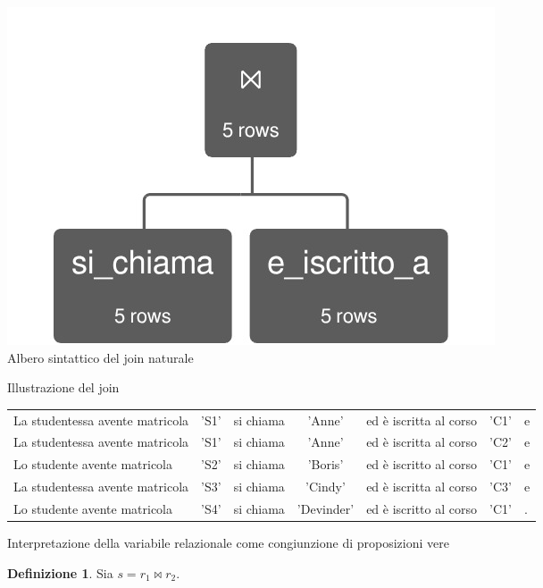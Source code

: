 \documentclass[withtimes]{easychair}
\theoremstyle{definition}
\newtheorem{definition}{Definizione}
\begin{document}
\begin{figure}[htp]
	\centering	
	\begin{subfigure}[t]{.75\textwidth}
		\centering
		\includegraphics[width=.4\textwidth]{img/inner_join}
		\caption{Albero sintattico del join naturale}\label{fig:inner-join-syn-tree}
	\end{subfigure}

	\vspace{1cm}	
		
	\begin{subfigure}[t]{\textwidth}
		\centering
		
      \caption{Illustrazione del join\label{fig:table-join}}
	\end{subfigure}

	\vspace{1cm}	
	
	\begin{subfigure}[t]{\textwidth}
		\centering
\begin{tabular}{lclclcl}
La studentessa avente matricola & 'S1' & si chiama & 'Anne' & ed è iscritta al corso & 'C1' & e \\
La studentessa avente matricola & 'S1' & si chiama & 'Anne' & ed è iscritta al corso & 'C2' & e \\
Lo studente avente matricola & 'S2' & si chiama & 	'Boris'& ed è iscritto al corso & 'C1' & e \\
La studentessa avente matricola & 'S3' & si chiama & 'Cindy'& ed è iscritta al corso & 'C3' &  e \\
Lo studente avente matricola & 'S4' & si chiama & 'Devinder'& ed è iscritto al corso & 'C1' & . \\
\end{tabular}
\caption{Interpretazione della variabile relazionale come congiunzione di proposizioni vere}\label{fig:proposizioni-join}
	\end{subfigure}
		
	\vspace{1cm}	

	\begin{subfigure}[t]{\textwidth}
		\centering
		\begin{definition}
		Sia $s = r_1 \bowtie r_2$.


\end{definition}
\end{subfigure}
\end{figure}
\end{document}
